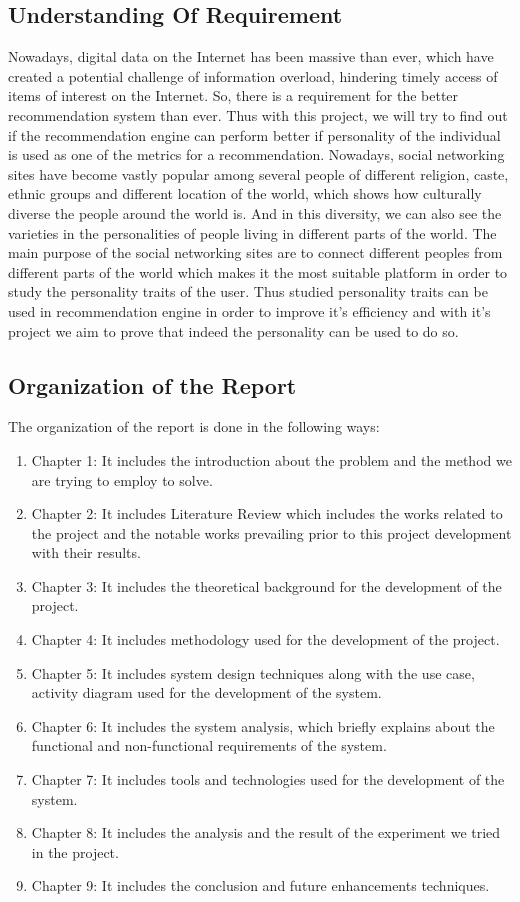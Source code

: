 \subsection{Understanding Of Requirement}
Nowadays, digital data on the Internet has been massive than ever, which have created a potential challenge of information overload, hindering timely access of items of interest on the Internet. So, there is a requirement for the better recommendation system than ever. Thus with this project, we will try to find out if the recommendation engine can perform better if personality of the individual is used as one of the metrics for a recommendation. Nowadays, social networking sites have become vastly popular among several people of different religion, caste, ethnic groups and different location of the world, which shows how culturally diverse the people around the world is. And in this diversity, we can also see the varieties in the personalities of people living in different parts of the world. The main purpose of the social networking sites are to connect different peoples from different parts of the world which makes it the most suitable platform in order to study the personality traits of the user. Thus studied personality traits can be used in recommendation engine in order to improve it's efficiency and with it's project we aim to prove that indeed the personality can be used to do so.

\subsection{Organization of the Report}
The organization of the report is done in the following ways:
\begin{enumerate}
\item Chapter 1: It includes the introduction about the problem and the method we are trying to employ to solve. 
\item Chapter 2: It includes Literature Review which includes the works related to the project and the notable works prevailing prior to this project development with their results.
\item Chapter 3: It includes the theoretical background for the development of the project.
\item Chapter 4: It includes methodology used for the development of the project.
\item Chapter 5: It includes system design techniques along with the use case, activity diagram used for the development of the system.
\item Chapter 6: It includes the system analysis, which briefly explains about the functional and non-functional requirements of the system.
\item Chapter 7: It includes tools and technologies used for the development of the system.
\item Chapter 8: It includes the analysis and the result of the experiment we tried in the project.
\item Chapter 9: It includes the conclusion and future enhancements techniques.
\end{enumerate}
